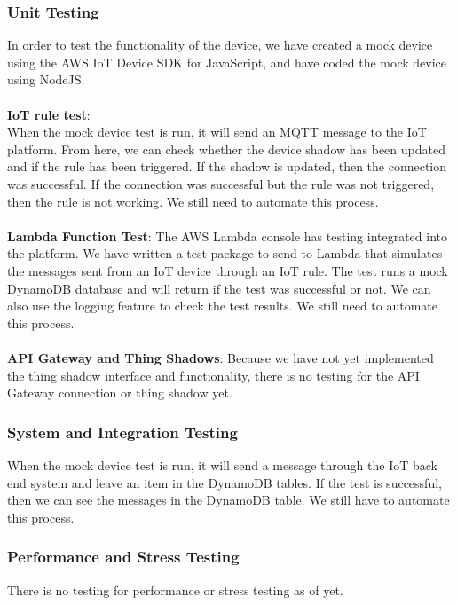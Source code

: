 \documentclass{article}
\begin{document}
		\subsubsection{Unit Testing}
			In order to test the functionality of the device, we have created a mock device using the AWS IoT Device SDK for
			JavaScript, and have coded the mock device using NodeJS.
			\\\\
			\textbf{IoT rule test}:
			\\
			When the mock device test is run, it will send an MQTT message to the IoT platform. From here, we can check whether
			the device shadow has been updated and if the rule has been triggered. If the shadow is updated, then the connection
			was successful. If the connection was successful but the rule was not triggered, then the rule is not working. We
			still need to automate this process.
			\\\\
			\textbf{Lambda Function Test}:
			The AWS Lambda console has testing integrated into the platform. We have written a test package to send to Lambda
			that simulates the messages sent from an IoT device through an IoT rule. The test runs a mock DynamoDB database
			and will return if the test was successful or not. We can also use the logging feature to check the test results.
			We still need to automate this process.
			\\\\
			\textbf{API Gateway and Thing Shadows}:
			Because we have not yet implemented the thing shadow interface and functionality, there is no testing for the API
			Gateway connection or thing shadow yet.
			
		\subsubsection{System and Integration Testing}
			When the mock device test is run, it will send a message through the IoT back end system and leave an item in the 
			DynamoDB tables. If the test is successful, then we can see the messages in the DynamoDB table. We still have to 
			automate this process.
			
		\subsubsection{Performance and Stress Testing}
			There is no testing for performance or stress testing as of yet.
		
\end{document}
